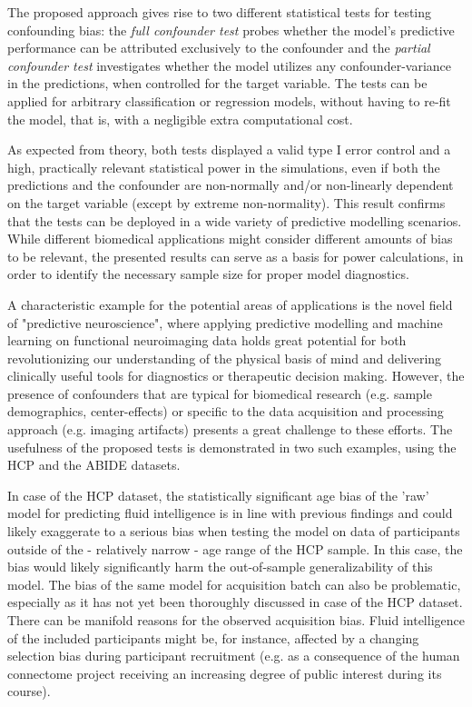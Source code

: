 \documentclass{article}
\begin{document}
The proposed approach gives rise to two different statistical tests for testing confounding bias: the \emph{full confounder test} probes whether the model's predictive performance can be attributed exclusively to the confounder and the \emph{partial confounder test} investigates whether the model utilizes any confounder-variance in the predictions, when controlled for the target variable. 
The tests can be applied for arbitrary classification or regression models, without having to re-fit the model, that is, with a negligible extra computational cost.

As expected from theory, both tests displayed a valid type I error control and a high, practically relevant statistical power in the simulations, even if both the predictions and the confounder are non-normally and/or non-linearly dependent on the target variable (except by extreme non-normality). This result confirms that the tests can be deployed in a wide variety of predictive modelling scenarios. While different biomedical applications might consider different amounts of bias to be relevant, the presented results can serve as a basis for power calculations, in order to identify the necessary sample size for proper model diagnostics.

A characteristic example for the potential areas of applications is the novel field of "predictive neuroscience", where applying predictive modelling and machine learning on functional neuroimaging data holds great potential for both revolutionizing our understanding of the physical basis of mind and delivering clinically useful tools for diagnostics or therapeutic decision making\citep{woo2017building, wager2013fmri, spisak2020pain}. However, the presence of confounders that are typical for biomedical research (e.g. sample demographics, center-effects) or specific to the data acquisition and processing approach (e.g. imaging artifacts) presents a great challenge to these efforts.
The usefulness of the proposed tests is demonstrated in two such examples, using the HCP\citep{van2013wu}  and the ABIDE\citep{di2014autism} datasets.


In case of the HCP dataset, the statistically significant age bias of the 'raw' model for predicting fluid intelligence is in line with previous findings\citep{dubois2018distributed, lohmann2021predicting} and could likely exaggerate to a serious bias when testing the model on data of participants outside of the - relatively narrow - age range of the HCP sample. In this case, the bias would likely significantly harm the out-of-sample generalizability of this model. The bias of the same model for acquisition batch can also be problematic, especially as it has not yet been thoroughly discussed in case of the HCP dataset. There can be manifold reasons for the observed acquisition bias. Fluid intelligence of the included participants might be, for instance, affected by a changing selection bias during participant recruitment (e.g. as a consequence of the human connectome project receiving an increasing degree of public interest during its course).
\end{document}
